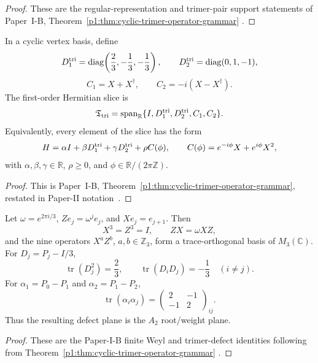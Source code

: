 \documentclass[12pt,a4paper]{article}
\begin{document}
\begin{proof}
These are the regular-representation and trimer-pair support statements of
Paper~I-B, Theorem~\ref{p1:thm:cyclic-trimer-operator-grammar}
\cite{Kugelmann2026Paper1BExceptional}.
\end{proof}

\begin{theorem}
\label{p2:thm:primitive-trimer-grammar}
In a cyclic vertex basis, define
\[
D^{\mathrm{tri}}_1=\operatorname{diag}\!\left(\frac23,-\frac13,-\frac13\right),
\qquad
D^{\mathrm{tri}}_2=\operatorname{diag}(0,1,-1),
\]
\[
 C_1=X+X^\dagger,
 \qquad
 C_2=-i(X-X^\dagger).
\]
The first-order Hermitian slice is
\[
\mathfrak T_{\rm tri}
=\operatorname{span}_{\mathbb R}
\{I,D^{\mathrm{tri}}_1,D^{\mathrm{tri}}_2,C_1,C_2\}.
\]
Equivalently, every element of the slice has the form
\[
 H=\alpha I+\beta D^{\mathrm{tri}}_1+\gamma D^{\mathrm{tri}}_2+\rho C(\phi),
 \qquad
 C(\phi)=e^{-i\phi}X+e^{i\phi}X^2,
\]
with
\(\alpha,\beta,\gamma\in\mathbb R\),
\(\rho\ge0\), and
\(\phi\in\mathbb R/(2\pi\mathbb Z)\).
\end{theorem}

\begin{proof}
This is Paper~I-B, Theorem~\ref{p1:thm:cyclic-trimer-operator-grammar}, restated
in Paper-II notation~\cite{Kugelmann2026Paper1BExceptional}.
\end{proof}

\begin{corollary}
\label{p2:cor:kinematic-trimer-weyl-a2}
Let \(\omega=e^{2\pi i/3}\), \(Ze_j=\omega^je_j\), and
\(Xe_j=e_{j+1}\).  Then
\[
 X^3=Z^3=I,
 \qquad
 ZX=\omega XZ,
\]
and the nine operators \(X^aZ^b\), \(a,b\in\mathbb Z_3\), form a
trace-orthogonal basis of \(M_3(\mathbb C)\).  For
\(D_j=P_j-I/3\),
\[
 \operatorname{tr}(D_j^2)=\frac23,
 \qquad
 \operatorname{tr}(D_iD_j)=-\frac13
 \quad(i\ne j).
\]
For \(\alpha_1=P_0-P_1\) and \(\alpha_2=P_1-P_2\),
\[
\operatorname{tr}(\alpha_i\alpha_j)
=
\begin{pmatrix}
2&-1\\
-1&2
\end{pmatrix}_{ij}.
\]
Thus the resulting defect plane is the \(A_2\) root/weight plane.
\end{corollary}

\begin{proof}
These are the Paper-I-B finite Weyl and trimer-defect identities following from
Theorem~\ref{p1:thm:cyclic-trimer-operator-grammar}
\cite{Kugelmann2026Paper1BExceptional}.
\end{proof}
\end{document}
